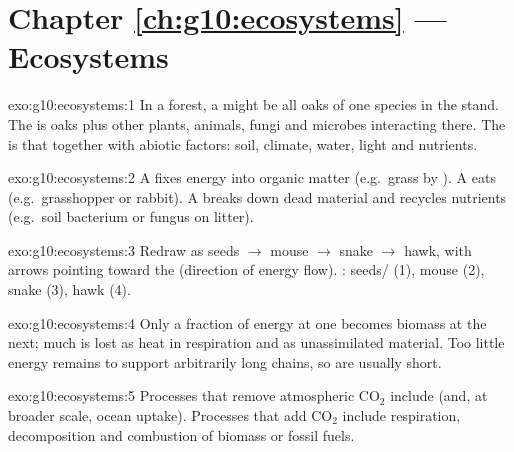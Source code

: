 \section*{Chapter \ref{ch:g10:ecosystems} --- Ecosystems}

\begin{solution}{exo:g10:ecosystems:1}
In a forest, a  might be all oaks of one species in the stand. The
 is oaks plus other plants, animals, fungi and microbes interacting
there. The  is that  together with abiotic factors: soil,
climate, water, light and nutrients.
\end{solution}

\begin{solution}{exo:g10:ecosystems:2}
A  fixes energy into organic matter (e.g.\ grass by ).
A  eats  (e.g.\ grasshopper or rabbit). A 
breaks down dead material and recycles nutrients (e.g.\ soil bacterium or
fungus on litter).
\end{solution}

\begin{solution}{exo:g10:ecosystems:3}
Redraw as seeds $\to$ mouse $\to$ snake $\to$ hawk, with arrows pointing toward
the  (direction of energy flow). : seeds/ (1),
mouse (2), snake (3), hawk (4).
\end{solution}

\begin{solution}{exo:g10:ecosystems:4}
Only a fraction of energy at one  becomes biomass at the next;
much is lost as heat in respiration and as unassimilated material. Too little
energy remains to support arbitrarily long chains, so  are usually
short.
\end{solution}

\begin{solution}{exo:g10:ecosystems:5}
Processes that remove atmospheric $\mathrm{CO_2}$ include  (and,
at broader scale, ocean uptake). Processes that add $\mathrm{CO_2}$ include
respiration, decomposition and combustion of biomass or fossil fuels.
\end{solution}

